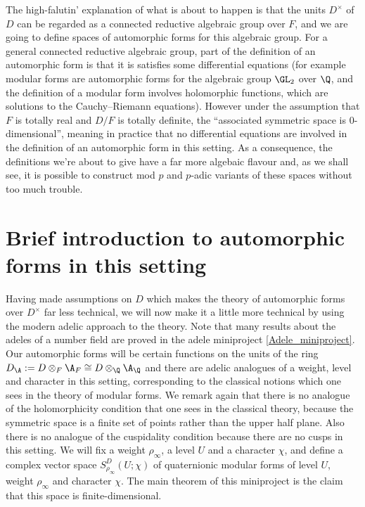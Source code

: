The high-falutin' explanation of what is about to happen is that the units $D^\times$ of $D$
can be regarded as a connected reductive algebraic group over $F$, and we are going to define spaces
of automorphic forms for this algebraic group. For a general connected reductive algebraic group,
part of the definition of an automorphic form is that it is satisfies some differential
equations (for example modular forms are automorphic forms for the algebraic group $\GL_2$ over
$\Q$, and the definition of a modular form involves holomorphic functions, which are solutions to
the Cauchy--Riemann equations). However under the assumption that $F$ is totally real and $D/F$ is
totally definite, the ``associated symmetric space is 0-dimensional'', meaning in practice that
no differential equations are involved in the definition of an automorphic form in this setting.
As a consequence, the definitions we're about to give have a far more algebaic flavour and, as
we shall see, it is possible to construct mod $p$ and $p$-adic variants of these spaces without
too much trouble.

\section{Brief introduction to automorphic forms in this setting}

Having made assumptions on $D$ which makes the theory of automorphic forms over $D^\times$
far less technical, we will now make it a little more technical by using the modern adelic
approach to the theory. Note that many results about the adeles of a number field are proved
in the adele miniproject \ref{Adele_miniproject}. Our automorphic forms will be certain
functions on the units of the ring $D_{\A}:=D\otimes_F\A_F\cong D\otimes_{\Q}\A_{\Q}$
and there are adelic analogues of a weight, level and character in this setting, corresponding
to the classical notions which one sees in the theory of modular forms. We remark again that
there is no analogue of the holomorphicity condition that one sees in the classical theory,
because the symmetric space is a finite set of points rather than the upper half plane. Also
there is no analogue of the cuspidality condition because there are no cusps in this setting.
We will fix a weight $\rho_\infty$, a level $U$ and a character $\chi$, and define
a complex vector space $S_{\rho_\infty}^D(U;\chi)$ of quaternionic modular forms of level $U$,
weight $\rho_\infty$ and character $\chi$. The main theorem of this miniproject is the claim
that this space is finite-dimensional.

